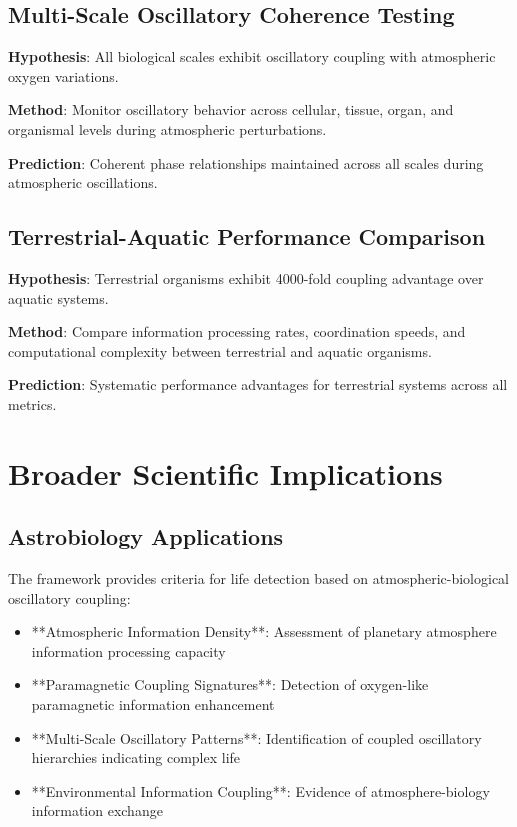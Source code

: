 \documentclass[twocolumn]{article}
\begin{document}
\subsection{Multi-Scale Oscillatory Coherence Testing}

\textbf{Hypothesis}: All biological scales exhibit oscillatory coupling with atmospheric oxygen variations.

\textbf{Method}: Monitor oscillatory behavior across cellular, tissue, organ, and organismal levels during atmospheric perturbations.

\textbf{Prediction}: Coherent phase relationships maintained across all scales during atmospheric oscillations.

\subsection{Terrestrial-Aquatic Performance Comparison}

\textbf{Hypothesis}: Terrestrial organisms exhibit 4000-fold coupling advantage over aquatic systems.

\textbf{Method}: Compare information processing rates, coordination speeds, and computational complexity between terrestrial and aquatic organisms.

\textbf{Prediction}: Systematic performance advantages for terrestrial systems across all metrics.

\section{Broader Scientific Implications}

\subsection{Astrobiology Applications}

The framework provides criteria for life detection based on atmospheric-biological oscillatory coupling:

\begin{itemize}
\item **Atmospheric Information Density**: Assessment of planetary atmosphere information processing capacity
\item **Paramagnetic Coupling Signatures**: Detection of oxygen-like paramagnetic information enhancement
\item **Multi-Scale Oscillatory Patterns**: Identification of coupled oscillatory hierarchies indicating complex life
\item **Environmental Information Coupling**: Evidence of atmosphere-biology information exchange
\end{itemize}
\end{document}
